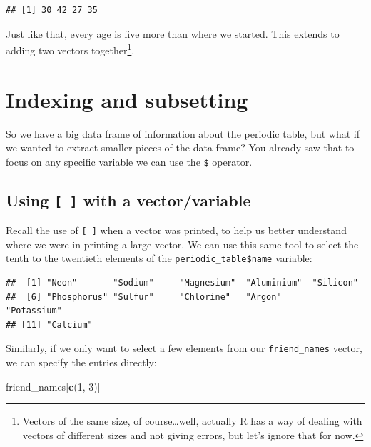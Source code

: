 \documentclass[]{tufte-book}
\newenvironment{Shaded}{\begin{snugshade}}{\end{snugshade}}
\newcommand{\DecValTok}[1]{\textcolor[rgb]{0.00,0.00,0.81}{#1}}
\newcommand{\FunctionTok}[1]{\textcolor[rgb]{0.13,0.29,0.53}{\textbf{#1}}}
\newcommand{\NormalTok}[1]{#1}
\newcommand{\SpecialCharTok}[1]{\textcolor[rgb]{0.81,0.36,0.00}{\textbf{#1}}}
\begin{document}
\begin{verbatim}
## [1] 30 42 27 35
\end{verbatim}

Just like that, every age is five more than where we started. This extends to adding two vectors together\footnote{Vectors of the same size, of course\ldots well, actually R has a way of dealing with vectors of different sizes and not giving errors, but let's ignore that for now.}.

\section{Indexing and subsetting}\label{index-sub}

So we have a big data frame of information about the periodic table, but what if we wanted to extract smaller pieces of the data frame? You already saw that to focus on any specific variable we can use the \texttt{\$} operator.

\subsection{\texorpdfstring{Using \texttt{{[}\ {]}} with a vector/variable}{Using {[} {]} with a vector/variable}}\label{using-with-a-vectorvariable}

Recall the use of \texttt{{[}\ {]}} when a vector was printed, to help us better understand where we were in printing a large vector. We can use this same tool to select the tenth to the twentieth elements of the \texttt{periodic\_table\$name} variable:

\begin{Shaded}
\end{Shaded}

\begin{verbatim}
##  [1] "Neon"       "Sodium"     "Magnesium"  "Aluminium"  "Silicon"   
##  [6] "Phosphorus" "Sulfur"     "Chlorine"   "Argon"      "Potassium" 
## [11] "Calcium"
\end{verbatim}

Similarly, if we only want to select a few elements from our \texttt{friend\_names} vector, we can specify the entries directly:

\begin{Shaded}
\begin{Highlighting}[]
\NormalTok{friend\_names[}\FunctionTok{c}\NormalTok{(}\DecValTok{1}\NormalTok{, }\DecValTok{3}\NormalTok{)]}
\end{Highlighting}
\end{Shaded}
\end{document}
